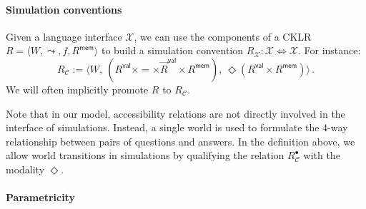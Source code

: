\documentclass[sigplan,10pt,review]{acmart}
\newcommand{\kw}[1]{\ensuremath{ \mathsf{#1} }}
\newcommand{\ans}{\bullet}
\newcommand{\vref}{\le_\kw{v}}
\newcommand{\mext}{\le_\kw{m}}
\newcommand{\pshift}{1.6ex}
\newcommand{\pcdist}{2.5}
\newcommand{\pcangle}{60}
\newcommand{\ph}[1]{%
  \tikz[remember picture]{\coordinate (#1);}}
\newcommand{\ptc}[2]{%
  \rule{0pt}{1.4em}%
  \tikz[remember picture, overlay]{
    \draw[->,#2]
      let \p{dest} = (#1),
          \n1 = {ln(veclen(\x{dest}, \y{dest}) + 1)},
          \p1 = ($(0,0)+(0,\pshift)$),
          \p4 = ($(#1)+(0,\pshift)$),
          \p2 = ($(\p1)!\n1*\pcdist!-\pcangle:(\p4)$),
          \p3 = ($(\p4)!\n1*\pcdist!+\pcangle:(\p1)$) in
        (\p1) .. controls (\p2) and (\p3) .. (\p4);}}
\newcommand{\bpt}[1]{%
  \ptc{#1}{black}}
\begin{document}

\paragraph{Simulation conventions}

Given a language interface $\mathcal{X}$,
we can use the components of a CKLR
$R = \langle W, {\leadsto}, f, R^\kw{mem} \rangle$
to build a simulation convention
$R_\mathcal{X} : \mathcal{X} \Leftrightarrow \mathcal{X}$.
For instance:
\[
  R_\mathcal{C} :=
    \langle
      W, \:
      (R^\kw{val} \times {=} \times \vec{R}^\kw{val} \times R^\kw{mem}), \:
      \Diamond (R^\kw{val} \times R^\kw{mem})
    \rangle \,.
\]
We will often implicitly promote $R$ to $R_\mathcal{C}$.

Note that in our model,
accessibility relations are not directly involved
in the interface of simulations.
Instead,
a single world is used to formulate
the 4-way relationship between
pairs of questions and answers.
In the definition above,
we allow world transitions in simulations
by qualifying the relation $R_\mathcal{C}^\ans$
with the modality $\Diamond$.


\paragraph{Parametricity}
\end{document}

